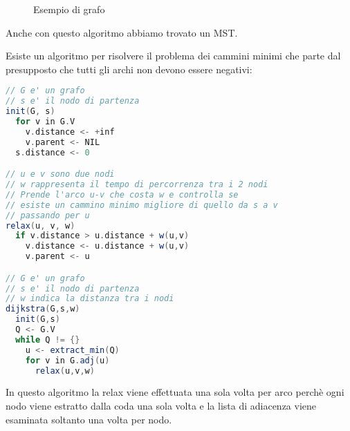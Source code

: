 \documentclass[a4paper]{article}
\begin{document}
\begin{example}
\begin{enumerate}
\begin{figure}[H]
        \caption{Esempio di grafo}
      \end{figure}
  \end{enumerate}
  Anche con questo algoritmo abbiamo trovato un MST.
\end{example}

\vspace{1em}
\noindent
Esiste un algoritmo per risolvere il problema dei cammini minimi che parte dal presupposto
che tutti gli archi non devono essere negativi:
\begin{lstlisting}[language=Scala]
// G e' un grafo
// s e' il nodo di partenza
init(G, s)
  for v in G.V
    v.distance <- +inf
    v.parent <- NIL
  s.distance <- 0

// u e v sono due nodi
// w rappresenta il tempo di percorrenza tra i 2 nodi
// Prende l'arco u-v che costa w e controlla se
// esiste un cammino minimo migliore di quello da s a v
// passando per u
relax(u, v, w)
  if v.distance > u.distance + w(u,v)
    v.distance <- u.distance + w(u,v)
    v.parent <- u

// G e' un grafo
// s e' il nodo di partenza
// w indica la distanza tra i nodi
dijkstra(G,s,w)
  init(G,s)
  Q <- G.V
  while Q != {}
    u <- extract_min(Q)
    for v in G.adj(u)
      relax(u,v,w)
\end{lstlisting}
In questo algoritmo la relax viene effettuata una sola volta per arco perchè ogni
nodo viene estratto dalla coda una sola volta e la lista di adiacenza viene esaminata
soltanto una volta per nodo.
\end{document}
